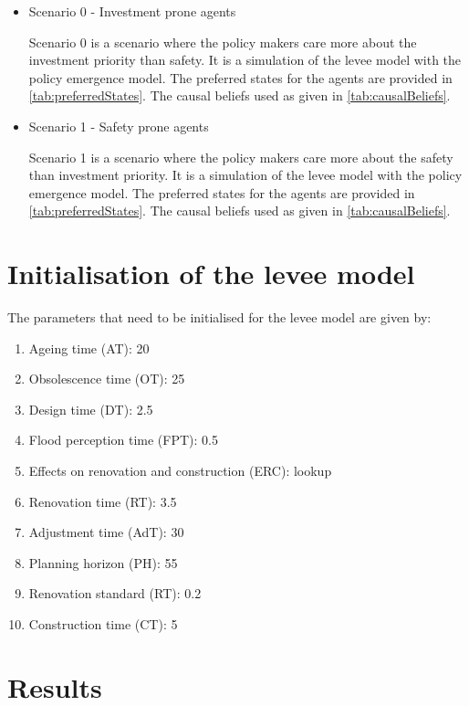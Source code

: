 \documentclass[12pt]{article}
\begin{document}
\begin{itemize}
\item Scenario 0 - Investment prone agents

Scenario 0 is a scenario where the policy makers care more about the investment priority than safety. It is a simulation of the levee model with the policy emergence model. The preferred states for the agents are provided in \autoref{tab:preferredStates}. The causal beliefs used as given in \autoref{tab:causalBeliefs}.

\item Scenario 1 - Safety prone agents

Scenario 1 is a scenario where the policy makers care more about the safety than investment priority. It is a simulation of the levee model with the policy emergence model. The preferred states for the agents are provided in \autoref{tab:preferredStates}. The causal beliefs used as given in \autoref{tab:causalBeliefs}.

\end{itemize}


\section{Initialisation of the levee model}
\label{sec:levee_initialisation}

The parameters that need to be initialised for the levee model are given by:

\begin{enumerate}
\item Ageing time (AT): 20
\item Obsolescence time (OT): 25
\item Design time (DT): 2.5
\item Flood perception time (FPT): 0.5
\item Effects on renovation and construction (ERC): lookup
\item Renovation time (RT): 3.5
\item Adjustment time (AdT): 30
\item Planning horizon (PH): 55
\item Renovation standard (RT): 0.2
\item Construction time (CT): 5
\end{enumerate}
	
\section{Results}
\label{sec:results}
\end{document}
